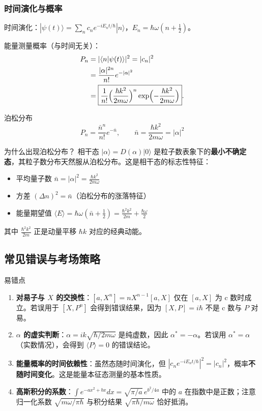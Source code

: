 \subsubsection{时间演化与概率}

时间演化：$|\psi(t)\rangle = \sum_n c_n e^{-iE_n t/\hbar}|n\rangle$，$E_n=\hbar\omega(n+\frac12)$。

能量测量概率（与时间无关）：
\begin{align*}
  P_n &= |\langle n|\psi(t)\rangle|^2 = |c_n|^2 \\
  &= \frac{|\alpha|^{2n}}{n!}e^{-|\alpha|^2} \\
  &= \boxed{\frac{1}{n!}\Bigl(\frac{\hbar k^2}{2m\omega}\Bigr)^n
     \exp\Bigl(-\frac{\hbar k^2}{2m\omega}\Bigr)}.
\end{align*}

\begin{formulabox}{泊松分布}
\[
  \boxed{P_n = \frac{\bar{n}^n}{n!}e^{-\bar{n}}, \qquad
    \bar{n} = \frac{\hbar k^2}{2m\omega} = |\alpha|^2}
\]
\end{formulabox}

\begin{insightbox}{为什么出现泊松分布？}
相干态 $|\alpha\rangle = D(\alpha)|0\rangle$ 是粒子数表象下的\textbf{最小不确定态}，其粒子数分布天然服从泊松分布。这是相干态的标志性特征：
\begin{itemize}
  \item 平均量子数 $\bar{n} = |\alpha|^2 = \frac{\hbar k^2}{2m\omega}$
  \item 方差 $(\Delta n)^2 = \bar{n}$（泊松分布的涨落特征）
  \item 能量期望值 $\langle E\rangle = \hbar\omega(\bar{n}+\frac12) = \frac{\hbar^2 k^2}{2m} + \frac{\hbar\omega}{2}$
\end{itemize}
其中 $\frac{\hbar^2 k^2}{2m}$ 正是动量平移 $\hbar k$ 对应的经典动能。
\end{insightbox}


\subsection{常见错误与考场策略}

\begin{errorbox}{易错点}
\begin{enumerate}
  \item \textbf{对易子与 $X$ 的交换性}：$[a,X^n]=nX^{n-1}[a,X]$ 仅在 $[a,X]$ 为 c 数时成立。若误用于 $[X,P^n]$ 会得到错误结果，因为 $[X,P]=i\hbar$ 不是 c 数与 $P$ 对易。
  \item \textbf{$\alpha$ 的虚实判断}：$\alpha=ik\sqrt{\hbar/2m\omega}$ 是纯虚数，因此 $\alpha^*=-\alpha$。若误用 $\alpha^*=\alpha$（实数情况），会得到 $\langle P\rangle=0$ 的错误结论。
  \item \textbf{能量概率的时间依赖性}：虽然态随时间演化，但 $|c_n e^{-iE_n t/\hbar}|^2=|c_n|^2$，概率\textbf{不随时间变化}。这是能量本征态测量的基本性质。
  \item \textbf{高斯积分的系数}：$\int e^{-ax^2+bx}dx = \sqrt{\pi/a}\,e^{b^2/4a}$ 中的 $a$ 在指数中是正数；注意归一化系数 $\sqrt{m\omega/\pi\hbar}$ 与积分结果 $\sqrt{\pi\hbar/m\omega}$ 恰好抵消。
\end{enumerate}
\end{errorbox}

